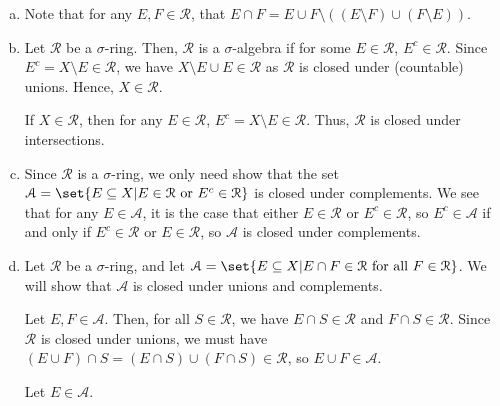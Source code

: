 \documentclass[10pt]{mypackage}
\begin{document}
\begin{solution}\hfill
  \begin{enumerate}[(a)]
    \item Note that for any $E,F\in \mathcal{R}$, that $E\cap F = E\cup F \setminus\left(\left(E\setminus F\right)\cup \left(F\setminus E\right)\right)$.
    \item Let $\mathcal{R}$ be a $\sigma$-ring. Then, $\mathcal{R}$ is a $\sigma$-algebra if for some $E\in \mathcal{R}$, $E^{c}\in \mathcal{R}$. Since $E^{c} = X\setminus E\in \mathcal{R}$, we have $X\setminus E \cup E \in \mathcal{R}$ as $\mathcal{R}$ is closed under (countable) unions. Hence, $X\in \mathcal{R}$.\newline

      If $X\in \mathcal{R}$, then for any $E\in \mathcal{R}$, $E^{c} = X\setminus E\in \mathcal{R}$. Thus, $\mathcal{R}$ is closed under intersections.
    \item Since $\mathcal{R}$ is a $\sigma$-ring, we only need show that the set $\mathcal{A} = \set{E\subseteq X | E\in \mathcal{R}\text{ or }E^{c}\in \mathcal{R}}$ is closed under complements. We see that for any $E\in \mathcal{A}$, it is the case that either $E\in \mathcal{R}$ or $E^{c}\in \mathcal{R}$, so $E^{c}\in \mathcal{A}$ if and only if $E^{c}\in \mathcal{R}$ or $E\in \mathcal{R}$, so $\mathcal{A}$ is closed under complements.
    \item Let $\mathcal{R}$ be a $\sigma$-ring, and let $\mathcal{A} = \set{E\subseteq X | E\cap F\in \mathcal{R}\text{ for all }F\in \mathcal{R}}$. We will show that $\mathcal{A}$ is closed under unions and complements.\newline

      Let $E,F\in \mathcal{A}$. Then, for all $S\in \mathcal{R}$, we have $E\cap S\in \mathcal{R}$ and $F\cap S\in \mathcal{R}$. Since $\mathcal{R}$ is closed under unions, we must have $\left(E\cup F\right)\cap S = \left(E\cap S\right)\cup \left(F\cap S\right)\in \mathcal{R}$, so $E\cup F\in \mathcal{A}$.\newline

      Let $E\in \mathcal{A}$.
  \end{enumerate}
\end{solution}
\end{document}
